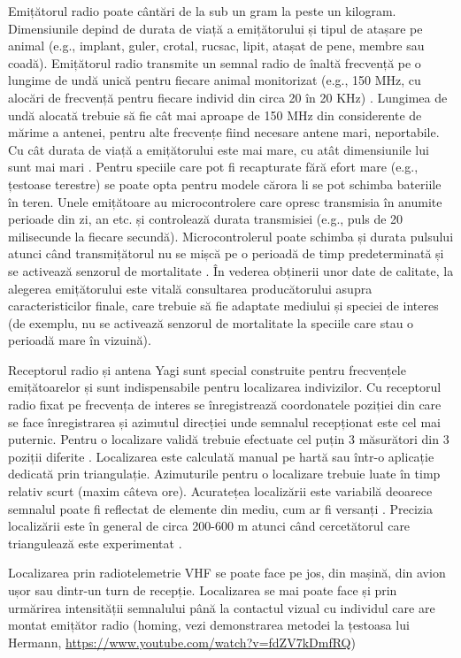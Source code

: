 \documentclass[11pt,onehalfspacing]{elife}
\begin{document}
Emițătorul radio poate cântări de la sub un gram la peste un kilogram. Dimensiunile depind de durata de viață a emițătorului și tipul de atașare pe animal (e.g., implant, guler, crotal, rucsac, lipit, atașat de pene, membre sau coadă). Emițătorul radio transmite un semnal radio de înaltă frecvență pe o lungime de undă unică pentru fiecare animal monitorizat (e.g., 150 MHz, cu alocări de frecvență pentru fiecare individ din circa 20 în 20 KHz) \citep{White2012}. Lungimea de undă alocată trebuie să fie cât mai aproape de 150 MHz din considerente de mărime a antenei, pentru alte frecvențe fiind necesare antene mari, neportabile. Cu cât durata de viață a emițătorului este mai mare, cu atât dimensiunile lui sunt mai mari \citep{Thomas2012}. Pentru speciile care pot fi recapturate fără efort mare (e.g., țestoase terestre) se poate opta pentru modele cărora li se pot schimba bateriile în teren. Unele emițătoare au microcontrolere care opresc transmisia în anumite perioade din zi, an etc. și controlează durata transmisiei (e.g., puls de 20 milisecunde la fiecare secundă). Microcontrolerul poate schimba și durata pulsului atunci când transmițătorul nu se mișcă pe o perioadă de timp predeterminată și se activează senzorul de mortalitate \citep{Silvy2012}. În vederea obținerii unor date de calitate, la alegerea emițătorului este vitală consultarea producătorului asupra caracteristicilor finale, care trebuie să fie adaptate mediului și speciei de interes (de exemplu, nu se activează senzorul de mortalitate la speciile care stau o perioadă mare în vizuină).

Receptorul radio și antena Yagi sunt special construite pentru frecvențele emițătoarelor și sunt indispensabile pentru localizarea indivizilor. Cu receptorul radio fixat pe frecvența de interes se înregistrează coordonatele poziției din care se face înregistrarea și azimutul direcției unde semnalul recepționat este cel mai puternic. Pentru o localizare validă trebuie efectuate cel puțin 3 măsurători din 3 poziții diferite \citep{White2012}. Localizarea este calculată manual pe hartă sau într-o aplicație dedicată prin triangulație. Azimuturile pentru o localizare trebuie luate în timp relativ scurt (maxim câteva ore). Acuratețea localizării este variabilă deoarece semnalul poate fi reflectat de elemente din mediu, cum ar fi versanți \citep{Boitani2000}. Precizia localizării este în general de circa 200-600 m atunci când cercetătorul care triangulează este experimentat \citep{Silvy2012}.

Localizarea prin radiotelemetrie VHF se poate face pe jos, din mașină, din avion ușor sau dintr-un turn de recepție. Localizarea se mai poate face și prin urmărirea intensității semnalului până la contactul vizual cu individul care are montat emițător radio \citep{Silvy2012} (homing, vezi demonstrarea metodei la țestoasa lui Hermann, \url{https://www.youtube.com/watch?v=fdZV7kDmfRQ})
\end{document}
